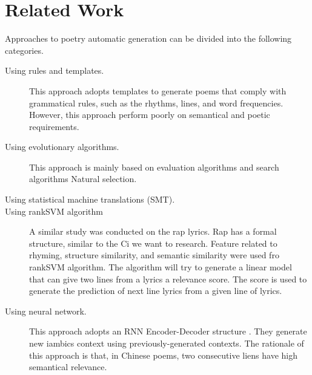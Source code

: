 \section{Related Work}  
Approaches to poetry automatic generation can be divided into the following categories.
\begin{description}
\item [Using rules and templates.] 
%
This approach adopts templates to generate poems that comply with grammatical rules, such as the rhythms, lines, and word frequencies\cite{wu2009new,tosa2008hitch}. 
%
However, this approach perform poorly on semantical and poetic requirements.
\item [Using evolutionary algorithms.] This approach is mainly based on evaluation algorithms and search algorithms
%
Natural selection.
\item [Using statistical machine translations (SMT).] 
\item [Using rankSVM algorithm]
A similar study was conducted on the rap lyrics\cite{malmi2015dopelearning}.  Rap has a formal structure, similar to the Ci we want to research. Feature related to rhyming, structure similarity, and semantic similarity were used fro rankSVM algorithm. The algorithm will try to generate a linear model that can give two lines from a lyrics a relevance score. The score is used to generate the prediction of next line lyrics from a given line of lyrics.
\item [Using neural network.]  This approach adopts an RNN Encoder-Decoder structure \cite{wang2016chinese,bahdanau2014neural}. 
%
They generate new iambics context using previously-generated contexts. The rationale of this approach is that, in Chinese poems, two consecutive liens have high semantical relevance.
\end{description}
